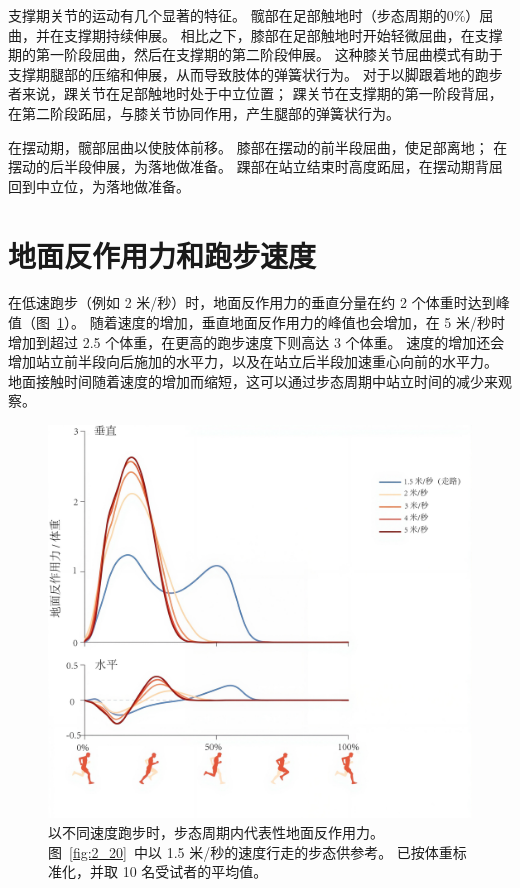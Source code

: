 支撑期关节的运动有几个显著的特征。
髋部在足部触地时（步态周期的0\%）屈曲，并在支撑期持续伸展。
相比之下，膝部在足部触地时开始轻微屈曲，在支撑期的第一阶段屈曲，然后在支撑期的第二阶段伸展。
这种膝关节屈曲模式有助于支撑期腿部的压缩和伸展，从而导致肢体的弹簧状行为。
对于以脚跟着地的跑步者来说，踝关节在足部触地时处于中立位置；
踝关节在支撑期的第一阶段背屈，在第二阶段跖屈，与膝关节协同作用，产生腿部的弹簧状行为。


在摆动期，髋部屈曲以使肢体前移。
膝部在摆动的前半段屈曲，使足部离地；
在摆动的后半段伸展，为落地做准备。
踝部在站立结束时高度跖屈，在摆动期背屈回到中立位，为落地做准备。


\section{地面反作用力和跑步速度}

在低速跑步（例如 2 米/秒）时，地面反作用力的垂直分量在约 2 个体重时达到峰值（图~\ref{fig:3_21}）。
随着速度的增加，垂直地面反作用力的峰值也会增加，在 5 米/秒时增加到超过 2.5 个体重，在更高的跑步速度下则高达 3 个体重。
速度的增加还会增加站立前半段向后施加的水平力，以及在站立后半段加速重心向前的水平力。
地面接触时间随着速度的增加而缩短，这可以通过步态周期中站立时间的减少来观察。


\begin{figure}[!htb]
	\centering
	\includegraphics[width=1.0\linewidth]{chap3/3_21}
	\caption{以不同速度跑步时，步态周期内代表性地面反作用力。
		图~\ref{fig:2_20}~中以 1.5 米/秒的速度行走的步态供参考。
		已按体重标准化，并取 10 名受试者的平均值\cite{hamner2013muscle}。 \label{fig:3_21}}
\end{figure}


